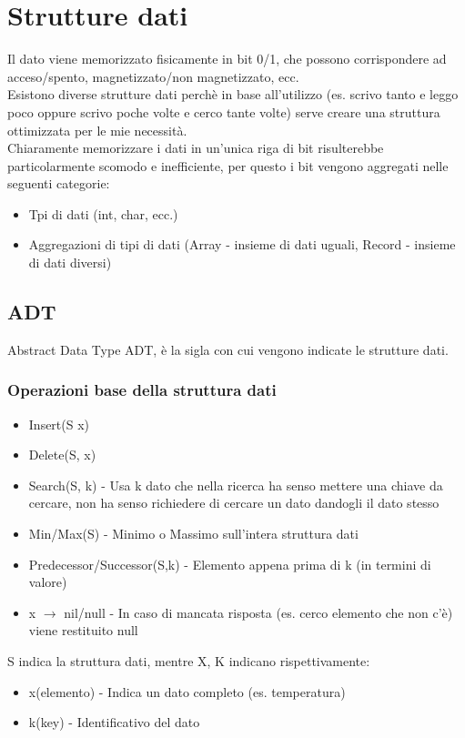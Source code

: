 \chapter{Strutture dati}
Il dato viene memorizzato fisicamente in bit 0/1, che possono corrispondere
ad acceso/spento, magnetizzato/non magnetizzato, ecc.\\
Esistono diverse strutture dati perchè in base all'utilizzo (es. scrivo tanto e leggo poco oppure
scrivo poche volte e cerco tante volte) serve creare una struttura ottimizzata per le
mie necessità.\\
Chiaramente memorizzare i dati in un'unica riga di bit risulterebbe particolarmente
scomodo e inefficiente, per questo i bit vengono aggregati nelle seguenti categorie:
\begin{itemize}
    \item Tpi di dati (int, char, ecc.)
    \item Aggregazioni di tipi di dati (Array - insieme di dati uguali, Record - insieme di dati diversi) 
\end{itemize}
\section{ADT}
Abstract Data Type ADT, è la sigla con cui vengono indicate le strutture dati.
\subsection{Operazioni base della struttura dati}
\begin{itemize}
    \item Insert(S x)
    \item Delete(S, x)
    \item Search(S, k) - Usa k dato che nella ricerca ha senso mettere una chiave da cercare, non
    ha senso richiedere di cercare un dato dandogli il dato stesso
    \item Min/Max(S) - Minimo o Massimo sull'intera struttura dati
    \item Predecessor/Successor(S,k) - Elemento appena prima di k (in termini di valore)
    \item x $\rightarrow$ nil/null - In caso di mancata risposta (es. cerco elemento che non c'è) viene restituito null
\end{itemize}
S indica la struttura dati, mentre
X, K indicano rispettivamente:
\begin{itemize}
    \item x(elemento) - Indica un dato completo (es. temperatura)
    \item k(key) - Identificativo del dato
\end{itemize}
